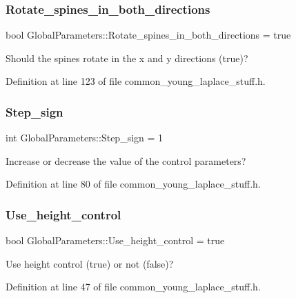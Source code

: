\subsubsection{\texorpdfstring{Rotate\+\_\+spines\+\_\+in\+\_\+both\+\_\+directions}{Rotate\_spines\_in\_both\_directions}}
{\footnotesize\ttfamily bool Global\+Parameters\+::\+Rotate\+\_\+spines\+\_\+in\+\_\+both\+\_\+directions = true}



Should the spines rotate in the x and y directions (true)? 



Definition at line 123 of file common\+\_\+young\+\_\+laplace\+\_\+stuff.\+h.

\mbox{\label{namespaceGlobalParameters_aeb81cc1c282502497ef6df576559b650}} 
\subsubsection{\texorpdfstring{Step\+\_\+sign}{Step\_sign}}
{\footnotesize\ttfamily int Global\+Parameters\+::\+Step\+\_\+sign = 1}



Increase or decrease the value of the control parameters? 



Definition at line 80 of file common\+\_\+young\+\_\+laplace\+\_\+stuff.\+h.

\mbox{\label{namespaceGlobalParameters_a624713d35bc418b2d5fa79f4d385a27a}} 
\subsubsection{\texorpdfstring{Use\+\_\+height\+\_\+control}{Use\_height\_control}}
{\footnotesize\ttfamily bool Global\+Parameters\+::\+Use\+\_\+height\+\_\+control = true}



Use height control (true) or not (false)? 



Definition at line 47 of file common\+\_\+young\+\_\+laplace\+\_\+stuff.\+h.



